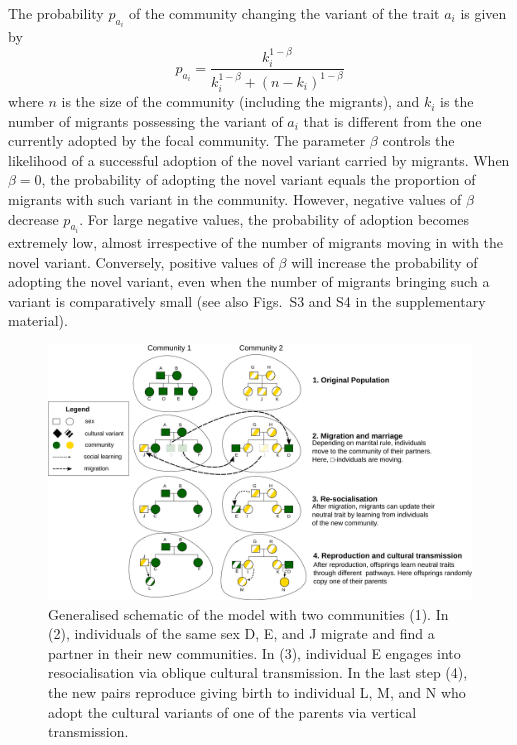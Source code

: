 \documentclass[9pt,twocolumn,twoside,lineno]{pnas-new}
\begin{document}
The probability $p_{a_i}$ of the community changing the variant of the trait $a_i$ is given by
\begin{equation}\label{eq:adoption}
p_{a_i} = \frac{k_i^{1-\beta}}{k_i^{1-\beta} + (n - k_i)^{1-\beta}}
\end{equation}
where $n$ is the size of the community (including the migrants), and $k_i$ is the number of migrants possessing the variant of $a_i$ that is different from the one currently adopted by the focal community. 
The parameter $\beta$ controls the likelihood of a successful adoption of the novel variant carried by migrants. 
When $\beta=0$, the probability of adopting the novel variant equals the proportion of migrants with such variant in the community. 
However, negative values of $\beta$ decrease $p_{a_i}$.
For large negative values, the probability of adoption becomes extremely low, almost irrespective of the number of migrants moving in with the novel variant.
Conversely, positive values of $\beta$ will increase the probability of adopting the novel variant, even when the number of migrants bringing such a variant is comparatively small (see also Figs.~S3 and S4 in the supplementary material). 

\begin{figure}[htb]
\includegraphics[width=17.0cm]{Figs/Figure1.png}
\caption{{\color{red}Generalised schematic of the model with two communities (1). In (2), individuals of the same sex D, E, and J migrate and find a partner in their new communities. In (3), individual E engages into resocialisation via oblique cultural transmission. In the last step (4), the new pairs reproduce giving birth to individual L, M, and N who adopt the cultural variants of one of the parents via vertical transmission.}} 
\label{fig:diagram}       
\end{figure}
\end{document}
